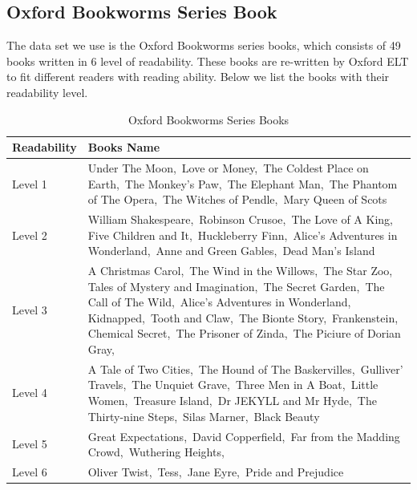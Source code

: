 \documentclass{article}
\begin{document}
\subsection{Oxford Bookworms Series Book}
The data set we use is the Oxford Bookworms series books\cite{oxford}, which consists of 49 books written in 6 level of readability. These books are re-written by Oxford ELT to fit different readers with reading ability. Below we list the books with their readability level.
\begin{table}[H]
{\renewcommand\arraystretch{1.25}
\begin{tabular}{|l|l|l|} \hline
Readability & \multicolumn{2}{l|}{Books Name} \\ \hline\hline
Level 1 & \multicolumn{2}{p{12cm}|}{\raggedright 
Under The Moon,\,
Love or Money,\,
The Coldest Place on Earth,\,
The Monkey's Paw,\,
The Elephant Man,\,
The Phantom of The Opera,\,
The Witches of Pendle,\,
Mary Queen of Scots} \\ \hline
Level 2 & \multicolumn{2}{p{12cm}|}{
William Shakespeare,\,
Robinson Crusoe,\,
The Love of A King,\,
Five Children and It,\,
Huckleberry Finn,\,
Alice's Adventures in Wonderland,\,
Anne and Green Gables,\,
Dead Man's Island
} \\ \hline
Level 3 & \multicolumn{2}{p{12cm}|}{
A Christmas Carol,\,
The Wind in the Willows,\,
The Star Zoo,\,
Tales of Mystery and Imagination,\,
The Secret Garden,\,
The Call of The Wild,\,
Alice's Adventures in Wonderland,\,
Kidnapped,\,
Tooth and Claw,\,
The Bionte Story,\,
Frankenstein,\,
Chemical Secret,\,
The Prisoner of Zinda,\,
The Piciure of Dorian Gray,\,
} \\ \hline
Level 4 & \multicolumn{2}{p{12cm}|}{
A Tale of Two Cities,\,
The Hound of The Baskervilles,\,
Gulliver' Travels,\,
The Unquiet Grave,\,
Three Men in A Boat,\,
Little Women,\,
Treasure Island,\,
Dr JEKYLL and Mr Hyde,\,
The Thirty-nine Steps,\,
Silas Marner,\,
Black Beauty
} \\ \hline
Level 5 & \multicolumn{2}{p{12cm}|}{
Great Expectations,\,
David Copperfield,\,
Far from the Madding Crowd,\,
Wuthering Heights,\,

} \\ \hline
Level 6 & \multicolumn{2}{p{12cm}|}{
Oliver Twist,\,
Tess,\,
Jane Eyre,\,
Pride and Prejudice

} \\ \hline
\end{tabular}}
\caption{Oxford Bookworms Series Books} \label{tab: testtime}
\end{table}
\end{document}
